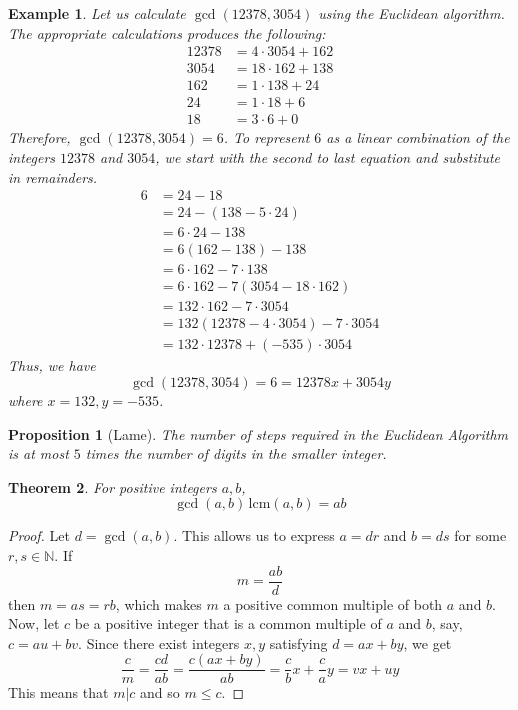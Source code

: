 \documentclass{article}
\newtheorem{theorem}{Theorem}[section]
\newtheorem{proposition}[theorem]{Proposition}
\newtheorem{example}{Example}[section]
\theoremstyle{remark}
\theoremstyle{definition}
\begin{document}
\begin{example}
Let us calculate $\gcd(12378, 3054)$ using the Euclidean algorithm. The appropriate calculations produces the following: 
\begin{align*}
    12378 & = 4 \cdot 3054 + 162 \\ 
    3054 & = 18 \cdot 162 + 138 \\
    162 & = 1 \cdot 138 + 24 \\
    24 & = 1 \cdot 18 + 6 \\
    18 & = 3 \cdot 6 + 0
\end{align*}
Therefore, $\gcd(12378, 3054) = 6$. To represent $6$ as a linear combination of the integers $12378$ and $3054$, we start with the second to last equation and substitute in remainders.
\begin{align*}
    6 & = 24 - 18 \\
    & = 24 - (138 - 5 \cdot 24) \\
    & = 6 \cdot 24 - 138 \\
    & = 6 (162 - 138) - 138 \\
    & = 6 \cdot 162 - 7 \cdot 138 \\
    & = 6 \cdot 162 - 7 (3054 - 18 \cdot 162) \\
    & = 132 \cdot 162 - 7 \cdot 3054 \\
    & = 132(12378 - 4 \cdot 3054) - 7 \cdot 3054 \\
    & = 132 \cdot 12378 + (-535) \cdot 3054
\end{align*}
Thus, we have 
\[\gcd(12378, 3054) = 6 = 12378 x + 3054 y\]
where $x = 132, y = -535$. 
\end{example}

\begin{proposition}[Lame]
The number of steps required in the Euclidean Algorithm is at most $5$ times the number of digits in the smaller integer. 
\end{proposition}

\begin{theorem}
For positive integers $a, b$, 
\[\gcd(a, b) \, \text{lcm}(a, b) = ab\]
\end{theorem}
\begin{proof}
Let $d = \gcd(a, b)$. This allows us to express $a= dr$ and $b = ds$ for some $r, s \in \mathbb{N}$. If 
\[m = \frac{ab}{d}\]
then $m = as = rb$, which makes $m$ a positive common multiple of both $a$ and $b$. Now, let $c$ be a positive integer that is a common multiple of $a$ and $b$, say, $c = au + bv$. Since there exist integers $x, y$ satisfying $d = ax + by$, we get
\[\frac{c}{m} = \frac{cd}{ab} = \frac{c(ax+by)}{ab} = \frac{c}{b} x + \frac{c}{a} y = vx + uy\]
This means that $m |c$ and so $m \leq c$. 
\end{proof}
\end{document}
